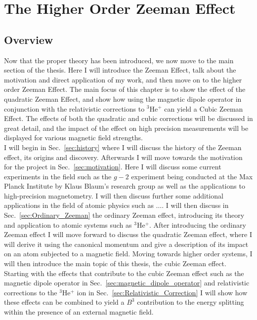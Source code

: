 \chapter{The Higher Order Zeeman Effect}\label{sec:Zeeman-Effect}
    \section{Overview}
        Now that the proper theory has been introduced, we now move to the main section of the thesis. Here I will introduce the Zeeman Effect, talk about the motivation and direct application of my work, and then move on to the higher order Zeeman Effect. The main focus of this chapter is to show the effect of the quadratic Zeeman Effect, and show how using the magnetic dipole operator in conjunction with the relativistic corrections to $^3$He$^+$ can yield a Cubic Zeeman Effect. The effects of both the quadratic and cubic corrections will be discussed in great detail, and the impact of the effect on high precision measurements will be displayed for various magnetic field strengths.\\

        I will begin in Sec.~\ref{sec:history} where I will discuss the history of the Zeeman effect, its origins and discovery. Afterwards I will move towards the motivation for the project in Sec.~\ref{sec:motivation}. Here I will discuss some current experiments in the field such as the $g-2$ experiment being conducted at the Max Planck Institute by Klaus Blaum's research group as well as the applications to high-precision magnetometry. I will then discuss further some additional applications in the field of atomic physics such as $\dots$. I will then discuss in Sec.~\ref{sec:Ordinary_Zeeman} the ordinary Zeeman effect, introducing its theory and application to atomic systems such as $^3$He$^+$. After introducing the ordinary Zeeman effect I will move forward to discuss the quadratic Zeeman effect, where I will derive it using the canonical momentum and give a description of its impact on an atom subjected to a magnetic field. Moving towards higher order systems, I will then introduce the main topic of this thesis, the cubic Zeeman effect. Starting with the effects that contribute to the cubic Zeeman effect such as the magnetic dipole operator in Sec.~\ref{sec:magnetic_dipole_operator} and relativistic corrections to the $^3$He$^+$ ion in Sec.~\ref{sec:Relativistic_Correction} I will show how these effects can be combined to yield a $B^3$ contribution to the energy splitting within the presence of an external magnetic field.
